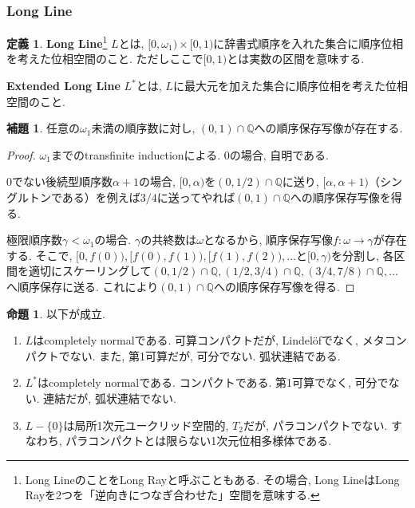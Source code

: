 \documentclass[a4paper, twoside]{bxjsarticle}
\newcommand{\quo}{\mathbb{Q}}
\theoremstyle{definition}
\newtheorem{prop}[thm]{命題}
\newtheorem{defn}[thm]{定義}
\newtheorem{lem}[thm]{補題}
\begin{document}
    \subsubsection{Long Line}
        \begin{defn}
            \textbf{Long Line}\footnote{Long LineのことをLong Rayと呼ぶこともある. その場合, Long LineはLong Rayを2つを「逆向きにつなぎ合わせた」空間を意味する.} $L$とは, $[0, \omega_1)\times[0, 1)$に辞書式順序を入れた集合に順序位相を考えた位相空間のこと. ただしここで$[0, 1)$とは実数の区間を意味する.
            
            \textbf{Extended Long Line} $L^*$とは, $L$に最大元を加えた集合に順序位相を考えた位相空間のこと.
        \end{defn}
        \begin{lem}
            任意の$\omega_1$未満の順序数に対し, $(0, 1)\cap\quo$への順序保存写像が存在する.
        \end{lem}
        \begin{proof}
            $\omega_1$までのtransfinite inductionによる. 
            0の場合, 自明である. 
            
            0でない後続型順序数$\alpha+1$の場合, $[0, \alpha)$を$(0, 1/2)\cap\quo$に送り, $[\alpha, \alpha+1)$（シングルトンである）を例えば$3/4$に送ってやれば$(0, 1)\cap\quo$への順序保存写像を得る.
            
            極限順序数$\gamma<\omega_1$の場合. $\gamma$の共終数は$\omega$となるから, 順序保存写像$f\colon \omega\to\gamma$が存在する. そこで, $[0, f(0)), [f(0), f(1)), [f(1), f(2)), \dots$と$[0, \gamma)$を分割し, 各区間を適切にスケーリングして$(0, 1/2)\cap\quo, (1/2, 3/4)\cap\quo, (3/4, 7/8)\cap\quo, \dots$へ順序保存に送る. これにより$(0, 1)\cap\quo$への順序保存写像を得る.
        \end{proof}
        \begin{prop}
            以下が成立.
            \begin{enumerate}
                \item $L$はcompletely normalである. 可算コンパクトだが, Lindelöfでなく, メタコンパクトでない. また, 第1可算だが, 可分でない. 弧状連結である. 
                \item $L^*$はcompletely normalである. コンパクトである. 第1可算でなく, 可分でない. 連結だが, 弧状連結でない.
                \item $L-\{0\}$は局所1次元ユークリッド空間的, $T_2$だが, パラコンパクトでない. すなわち, パラコンパクトとは限らない1次元位相多様体である.
            \end{enumerate}
        \end{prop}
\end{document}
